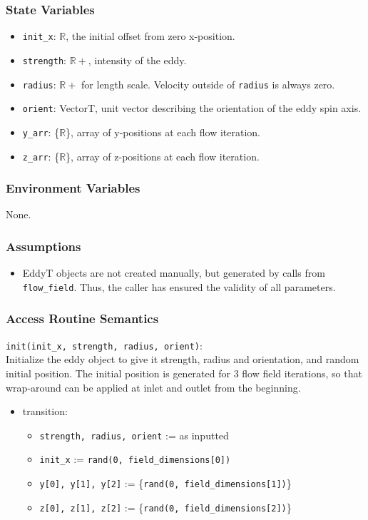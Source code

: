 \documentclass[12pt, titlepage]{article}
\begin{document}
\subsubsection{State Variables}
\begin{itemize}
  \item \texttt{init\_x}: $\mathbb{R}$, the initial offset from zero x-position.
  \item \texttt{strength}: $\mathbb{R+}$, intensity of the eddy.
  \item \texttt{radius}: $\mathbb{R+}$ for length scale. Velocity outside of \texttt{radius} is always zero.
  \item \texttt{orient}: VectorT, unit vector describing the orientation of the eddy spin axis.
  \item \texttt{y\_arr}: \{$\mathbb{R}$\}, array of y-positions at each flow iteration.
  \item \texttt{z\_arr}: \{$\mathbb{R}$\}, array of z-positions at each flow iteration.
\end{itemize}

\subsubsection{Environment Variables}
None.

\subsubsection{Assumptions}
\begin{itemize}
  \item EddyT objects are not created manually, but generated by calls from \texttt{flow\_field}. Thus, the caller has ensured the validity of all parameters.
\end{itemize}

\subsubsection{Access Routine Semantics}

\noindent \texttt{init(init\_x, strength, radius, orient)}:\\
Initialize the eddy object to give it strength, radius and orientation, and random initial position. The initial position is generated for 3 flow field iterations, so that wrap-around can be applied at inlet and outlet from the beginning.
\begin{itemize}
\item transition: 
  \begin{itemize}
  \item \texttt{strength, radius, orient} := as inputted
  \item \texttt{init\_x} := \texttt{rand(0, field\_dimensions[0])}
  \item \texttt{y[0], y[1], y[2]} := \{\texttt{rand(0, field\_dimensions[1])}\}
  \item \texttt{z[0], z[1], z[2]} := \{\texttt{rand(0, field\_dimensions[2])}\}
  \end{itemize}
\end{itemize}
\end{document}
